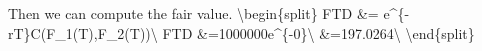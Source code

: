 \documentclass[11pt]{article}
\begin{document}
    Then we can compute the fair value. \textbackslash{}begin\{split\} FTD
\&= e\^{}\{-rT\}C(F\_1(T),F\_2(T))\textbackslash{} FTD
\&=1000000\times e\^{}\{-0\}\textbackslash{}
\&=197.0264\textbackslash{} \textbackslash{}end\{split\}


    
    
    
    
\end{document}
